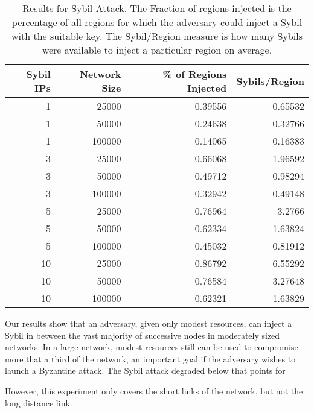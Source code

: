 \documentclass[a4paper]{article}
\begin{document}
\begin{table}[h]\small

\begin{center}
       
\begin{tabular}{|r|r|r|r|}
    \hline
    Sybil IPs & Network Size & \% of Regions Injected & Sybils/Region \\ \hline
    1 & 25000 & 0.39556 & 0.65532 \\ \hline
    1 & 50000 & 0.24638 & 0.32766 \\ \hline
    1 & 100000 & 0.14065 & 0.16383 \\ \hline
    3 & 25000 & 0.66068 & 1.96592 \\ \hline
    3 & 50000 & 0.49712 & 0.98294 \\ \hline
    3 & 100000 & 0.32942 & 0.49148 \\ \hline
    5 & 25000 & 0.76964 & 3.2766 \\ \hline
    5 & 50000 & 0.62334 & 1.63824 \\ \hline
    5 & 100000 & 0.45032 & 0.81912 \\ \hline
    10 & 25000 & 0.86792 & 6.55292 \\ \hline
    10 & 50000 & 0.76584 & 3.27648 \\ \hline
    10 & 100000 & 0.62321 & 1.63829 \\ \hline
\end{tabular}
\label{exp2}
\caption{Results for Sybil Attack.  The Fraction of regions injected is the percentage of all regions for which the adversary could inject a Sybil with the suitable key. The Sybil/Region measure is how many Sybils were available to inject a particular region on average.}
\end{center}

\end{table}

Our results show that an adversary, given only modest resources, can inject a Sybil in between the vast majority of successive nodes in moderately sized networks.
In a large network, modest resources still can be used to compromise more that a third of the network, an  important goal if the adversary  wishes to launch a Byzantine attack.
The Sybil attack degraded below that points for 


However, this experiment only covers the short links of the network, but not the long distance link.
\end{document}
